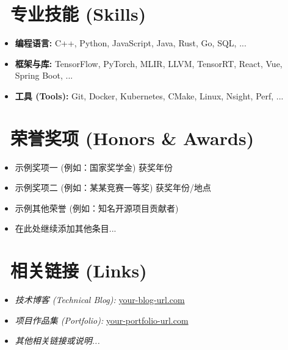 \documentclass{resume}
\begin{document}
\section{\faWrench\ 专业技能 (Skills)}
\begin{itemize}[parsep=0.2ex] %
    \item \textbf{编程语言:} C++, Python, JavaScript, Java, Rust, Go, SQL, ... %
    \item \textbf{框架与库:} TensorFlow, PyTorch, MLIR, LLVM, TensorRT, React, Vue, Spring Boot, ... %
    \item \textbf{工具 (Tools):} Git, Docker, Kubernetes, CMake, Linux, Nsight, Perf, ... %
\end{itemize}

\section{\faDiamond\ 荣誉奖项 (Honors & Awards)}
\begin{itemize}[parsep=0.2ex] %
  \item 示例奖项一 (例如：国家奖学金) \hfill{获奖年份} 
  \item 示例奖项二 (例如：某某竞赛一等奖) \hfill{获奖年份/地点} 
  \item 示例其他荣誉 (例如：知名开源项目贡献者) 
  \item 在此处继续添加其他条目...
\end{itemize}

\section{\faLink\ 相关链接 (Links)}
\begin{itemize}[parsep=0.2ex] %
    \item \textit{技术博客 (Technical Blog):} \href{https://your-blog-url.com}{your-blog-url.com}
    \item \textit{项目作品集 (Portfolio):} \href{https://your-portfolio-url.com}{your-portfolio-url.com} 
    \item \textit{其他相关链接或说明...} 
\end{itemize}
\end{document}
